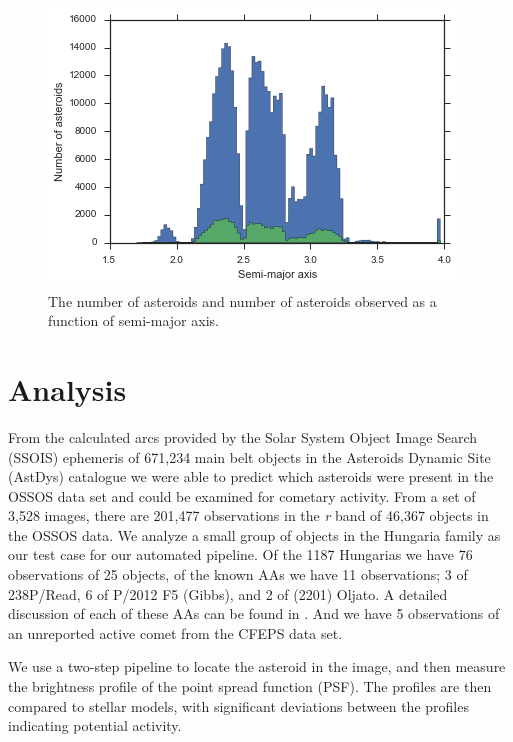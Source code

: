 \documentclass[iop,apj]{emulateapj}
\begin{document}
\begin{figure}[!htb]
    \centering
    \includegraphics[width=\linewidth]{graphs/hist_a.png}
    \caption{The number of asteroids and number of asteroids observed as a function of semi-major axis.}\label{fig:3}
\end{figure}

\section{Analysis}

From the calculated arcs provided by the Solar System Object Image Search (SSOIS) ephemeris \citep{ssois} of 671,234 main belt objects in the Asteroids Dynamic Site (AstDys) catalogue \citep{astdys} we were able to predict which asteroids were present in the OSSOS data set and could be examined for cometary activity. From a set of 3,528 images, there are 201,477 observations in the \textit{r} band of 46,367 objects in the OSSOS data. We analyze a small group of objects in the Hungaria family as our test case for our automated pipeline. Of the 1187 Hungarias we have 76 observations of 25 objects, of the known AAs we have 11 observations; 3 of 238P/Read, 6 of P/2012 F5 (Gibbs), and 2 of (2201) Oljato.  A detailed discussion of each of these AAs can be found in \cite{jewitt15}. And we have 5 observations of an unreported active comet from the CFEPS data set.

We use a two-step pipeline to locate the asteroid in the image, and then measure the brightness profile of the point spread function (PSF). The profiles are then compared to stellar models, with significant deviations between the profiles indicating potential activity.
\end{document}
